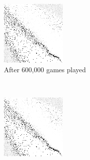 \begin{figure}
	\begin{subfigure}[t]{0.3\textwidth}
	\includegraphics[width=\textwidth]{images/findings/round2/flipbook/winner/checkpoint_600000.png}
	\caption{After 600,000 games played}
	\end{subfigure}
	~
	\begin{subfigure}[t]{0.3\textwidth}
	\includegraphics[width=\textwidth]{images/findings/round2/flipbook/winner/checkpoint_800000.png}

\end{subfigure}
\end{figure}
